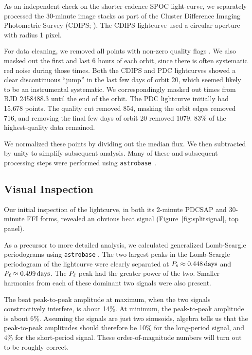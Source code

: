 \documentclass[12pt,twocolumn,tighten]{aastex62}
\begin{document}
As an independent check on the shorter cadence SPOC light-curve, we
separately processed the 30-minute image stacks as part of the Cluster
Difference Imaging Photometric Survey (CDIPS;
\citep{bouma_cluster_2019}).  The CDIPS lightcurve used a circular
aperture with radius 1 pixel.

For data cleaning, we removed all points with non-zero quality flags
\citep[{\it e.g.},][]{tess_data_product_description_2018}.  We also
masked out the first and last 6 hours of each orbit, since there is
often systematic red noise during those times.  Both the CDIPS and PDC
lightcurves showed a clear discontinuous ``jump'' in the last few days
of orbit 20, which seemed likely to be an instrumental systematic.  We
correspondingly masked out times from BJD 2458488.3 until the end of
the orbit.  The PDC lightcurve initially had 15{,}678 points.  The
quality cut removed 854, masking the orbit edges removed 716, and
removing the final few days of orbit 20 removed 1079.  83\% of the
highest-quality data remained.

We normalized these points by dividing out the median flux. We then
subtracted by unity to simplify subsequent analysis.  Many of these
and subsequent processing steps were performed using
\texttt{astrobase}~\citep{bhatti_astrobase_2018}. 


\subsection{Visual Inspection}

Our initial inspection of the lightcurve, in both its 2-minute PDCSAP
and 30-minute FFI forms, revealed an obvious beat signal
(Figure~\ref{fig:splitsignal}, top panel).

As a precursor to more detailed analysis, we calculated generalized
Lomb-Scargle periodograms using \texttt{astrobase}
\citep{lomb_1976,scargle_studies_1982,vanderplas_periodograms_2015,bhatti_astrobase_2018}.
The two largest peaks in the Lomb-Scargle periodogram of the
lightcurve were clearly separated at $P_{\rm s} \approx 0.448\,{\rm
days}$ and $P_{\rm \ell} \approx 0.499\,{\rm days}$.  The $P_{\rm
\ell}$ peak had the greater power of the two.  Smaller harmonics from
each of these dominant two signals were also present.


The beat peak-to-peak amplitude at maximum, when the two signals
constructively interfere, is about 14\%.  At minimum, the peak-to-peak
amplitude is about 6\%.  Assuming the signals are just two sinusoids,
algebra tells us that the peak-to-peak amplitudes should therefore be
10\% for the long-period signal, and 4\% for the short-period signal.
These order-of-magnitude numbers will turn out to be roughly correct.
\end{document}
